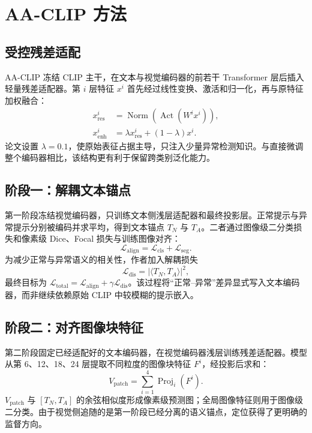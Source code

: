 \documentclass[UTF8,a4paper,10pt,fontset=windows]{ctexart}
\newcommand{\TN}{T_{N}}
\newcommand{\TA}{T_{A}}
\newcommand{\loss}{\mathcal{L}}
\begin{document}
\section{AA-CLIP 方法}

\subsection{受控残差适配}

AA-CLIP 冻结 CLIP 主干，在文本与视觉编码器的前若干 Transformer 层后插入轻量残差适配器。第 $i$ 层特征 $x^i$ 首先经过线性变换、激活和归一化，再与原特征加权融合：
\begin{align}
x_{\mathrm{res}}^i &= \operatorname{Norm}\!\left(\operatorname{Act}(W^i x^i)\right), \\
x_{\mathrm{enh}}^i &= \lambda x_{\mathrm{res}}^i+(1-\lambda)x^i .
\end{align}
论文设置 $\lambda=0.1$，使原始表征占据主导，只注入少量异常检测知识。与直接微调整个编码器相比，该结构更有利于保留跨类别泛化能力。

\subsection{阶段一：解耦文本锚点}

第一阶段冻结视觉编码器，只训练文本侧浅层适配器和最终投影层。正常提示与异常提示分别被编码并求平均，得到文本锚点 $\TN$ 与 $\TA$。二者通过图像级二分类损失和像素级 Dice、Focal 损失与训练图像对齐：
\begin{equation}
\loss_{\mathrm{align}}
=\loss_{\mathrm{cls}}+\loss_{\mathrm{seg}}.
\end{equation}
为减少正常与异常语义的相关性，作者加入解耦损失
\begin{equation}
\loss_{\mathrm{dis}}=\left|\langle \TN,\TA\rangle\right|^2,
\end{equation}
最终目标为 $\loss_{\mathrm{total}}=\loss_{\mathrm{align}}+\gamma\loss_{\mathrm{dis}}$。该过程将“正常--异常”差异显式写入文本编码器，而非继续依赖原始 CLIP 中较模糊的提示嵌入。

\subsection{阶段二：对齐图像块特征}

第二阶段固定已经适配好的文本编码器，在视觉编码器浅层训练残差适配器。模型从第 6、12、18、24 层提取不同粒度的图像块特征 $F^i$，经投影后求和：
\begin{equation}
V_{\mathrm{patch}}=\sum_{i=1}^{4}\operatorname{Proj}_{i}(F^i).
\end{equation}
$V_{\mathrm{patch}}$ 与 $[\TN,\TA]$ 的余弦相似度形成像素级预测图；全局图像特征则用于图像级二分类。由于视觉侧追随的是第一阶段已经分离的语义锚点，定位获得了更明确的监督方向。
\end{document}

